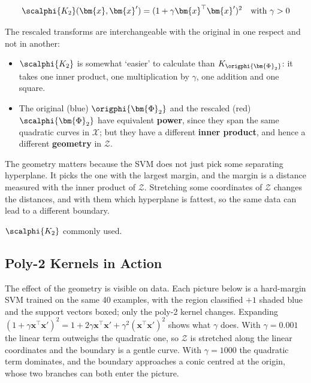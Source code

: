 \begin{moral}
    \[
        \scalphi{K_2}(\bm{x}, \bm{x}') = (1 + \gamma \bm{x}^\top \bm{x}')^2
        \quad \text{with } \gamma > 0
    \]
\end{moral}

The rescaled transforms are interchangeable with the original in one respect
and not in another:
\begin{itemize}
    \item \(\scalphi{K_2}\) is somewhat `easier' to calculate than
        \(K_{\origphi{\bm{\Phi}_2}}\): it takes one inner product, one
        multiplication by \(\gamma\), one addition and one square.
    \item The original (blue) \(\origphi{\bm{\Phi}_2}\) and the rescaled
        (red) \(\scalphi{\bm{\Phi}_2}\) have equivalent \textbf{power}, since
        they span the same quadratic curves in \(\mathcal{X}\); but they have
        a different \textbf{inner product}, and hence a different
        \textbf{geometry} in \(\mathcal{Z}\).
\end{itemize}
The geometry matters because the SVM does not just pick some separating
hyperplane. It picks the one with the largest margin, and the margin is a
distance measured with the inner product of \(\mathcal{Z}\). Stretching some
coordinates of \(\mathcal{Z}\) changes the distances, and with them which
hyperplane is fattest, so the same data can lead to a different boundary.

\begin{moral}
    \(\scalphi{K_2}\) commonly used.
\end{moral}

\subsection{Poly-2 Kernels in Action}

The effect of the geometry is visible on data. Each picture below is a
hard-margin SVM trained on the same 40 examples, with the region classified
\(+1\) shaded blue and the support vectors boxed; only the poly-2 kernel
changes. Expanding \((1 + \gamma \bm{x}^\top \bm{x}')^2 = 1 + 2\gamma
\bm{x}^\top \bm{x}' + \gamma^2 (\bm{x}^\top \bm{x}')^2\) shows what
\(\gamma\) does. With \(\gamma = 0.001\) the linear term outweighs the
quadratic one, so \(\mathcal{Z}\) is stretched along the linear coordinates
and the boundary is a gentle curve. With \(\gamma = 1000\) the quadratic term
dominates, and the boundary approaches a conic centred at the origin, whose
two branches can both enter the picture.

